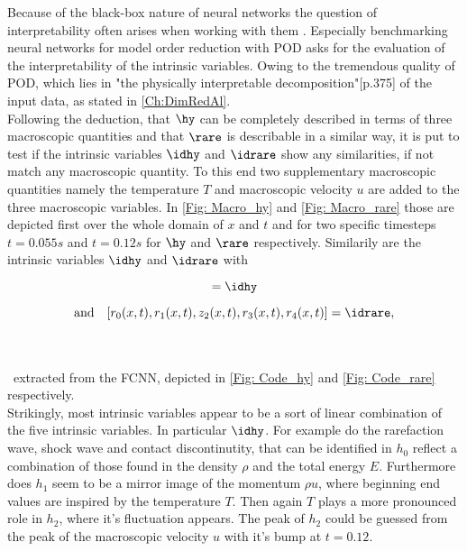 Because of the black-box nature of neural networks the question of interpretability often arises when working with them \cite{fan2021interpretability}. Especially benchmarking neural networks for model order reduction with POD asks for the evaluation of the interpretability of the intrinsic variables. Owing to the tremendous quality of POD, which lies in "the physically interpretable decomposition"\cite{Kutz}[p.375] of the input data, as stated in \cref{Ch:DimRedAl}.\\
Following the deduction, that \(\hy\) can be completely described in terms of three macroscopic quantities and that \(\rare\) is describable in a similar way, it is put to test if the intrinsic variables \(\idhy\) and \(\idrare\) show any similarities, if not match any macroscopic quantity. To this end two supplementary macroscopic quantities namely the temperature \(T\) and macroscopic velocity \(u\) are added to the three macroscopic variables. In \cref{Fig: Macro_hy} and \cref{Fig: Macro_rare} those are depicted first over the whole domain of \(x\) and \(t\) and for two specific timesteps \(t=0.055s\) and \(t=0.12s\) for \(\hy\) and \(\rare\) respectively. Similarily are the intrinsic variables \(\idhy\) and \(\idrare\) with\\
\begin{minipage}{0.38\textwidth}
	\begin{equation}
		[h_0(x,t),h_1(x,t),h_2(x,t)] = \idhy
	\end{equation}
\end{minipage}%
\begin{minipage}{0.6\textwidth}
	\begin{equation}
		\mathrm{and}\quad[r_0(x,t),r_1(x,t),z_2(x,t),r_3(x,t),r_4(x,t)] = \idrare \mathrm{,}
	\end{equation}
\end{minipage}\\\\\
extracted from the FCNN, depicted in \cref{Fig: Code_hy} and \cref{Fig: Code_rare} respectively.\\
Strikingly, most intrinsic variables appear to be a sort of linear combination of the five intrinsic variables. In particular \(\idhy\). For example do the rarefaction wave, shock wave and contact discontinutity, that can be identified in \(h_0\) reflect a combination of those found in the density \(\rho\) and the total energy \(E\). Furthermore does \(h_1\) seem to be a mirror image of the momentum \(\rho u\), where beginning end values are inspired by the temperature \(T\). Then again \(T\) plays a more pronounced role in \(h_2\), where it's fluctuation appears. The peak of \(h_2\) could be guessed from the peak of the macroscopic velocity \(u\) with it's bump at \(t=0.12\).\\
